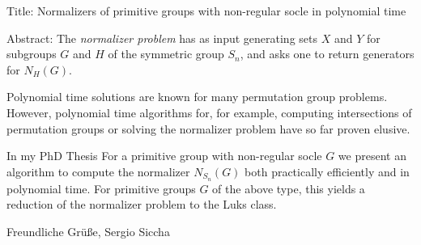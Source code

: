 Title:
Normalizers of primitive groups with non-regular socle in polynomial time

Abstract:
The \emph{normalizer problem} has as input generating sets $X$ and
$Y$ for subgroups $G$ and $H$ of the symmetric group $S_n$, and asks
one to return generators for $N_H(G)$.

Polynomial time solutions are known for many permutation group
problems. However, polynomial time algorithms for, for example, computing
intersections of permutation groups or solving the normalizer problem have so
far proven elusive.

In my PhD Thesis For a primitive group with non-regular socle $G$ we present an
algorithm to compute the normalizer $N_{S_n}(G)$ both practically
efficiently and in polynomial time. For primitive groups $G$ of the
above type, this yields a reduction of the normalizer problem to the
Luks class.

Freundliche Grüße,
Sergio Siccha
